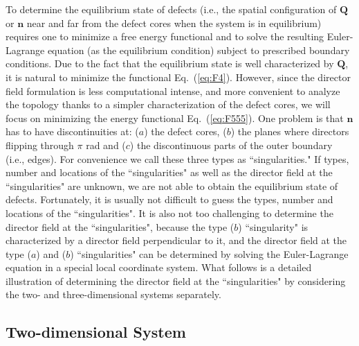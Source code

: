 \documentclass[nottitlepage]{article}
\begin{document}
To determine the equilibrium state of defects (i.e., the spatial configuration of $\mathbf{Q}$ or $\mathbf{n}$ near and far from the defect cores when the system is in equilibrium) requires one to minimize a free energy functional and to solve the resulting Euler-Lagrange equation (as the equilibrium condition) subject to prescribed boundary conditions. Due to the fact that the equilibrium state is well characterized by $\mathbf{Q}$, it is natural to minimize the functional Eq.~(\ref{eq:F4}). However, since the director field formulation is less computational intense, and more convenient to analyze the topology thanks to a simpler characterization of the defect cores, we will focus on minimizing the energy functional Eq.~(\ref{eq:F555}). One problem is that $\mathbf{n}$ has to have discontinuities at: ($a$) the defect cores, ($b$) the planes where directors flipping through $\pi$ rad and ($c$) the discontinuous parts of the outer boundary (i.e., edges). For convenience we call these three types as ``singularities." If types, number and locations of the ``singularities" as well as the director field at the ``singularities" are unknown, we are not able to obtain the equilibrium state of defects. %
Fortunately, it is usually not difficult to guess the types, number and locations of the ``singularities". It is also not too challenging to determine the director field at the ``singularities", because the type ($b$) ``singularity" is characterized by a director field perpendicular to it, and the director field at the type ($a$) and ($b$) ``singularities" can be determined by solving the Euler-Lagrange equation in a special local coordinate system. %
What follows is a detailed illustration of determining the director field at the ``singularities" by considering the two- and three-dimensional systems separately.

\subsection{Two-dimensional System}\label{sec:two}
\end{document}
